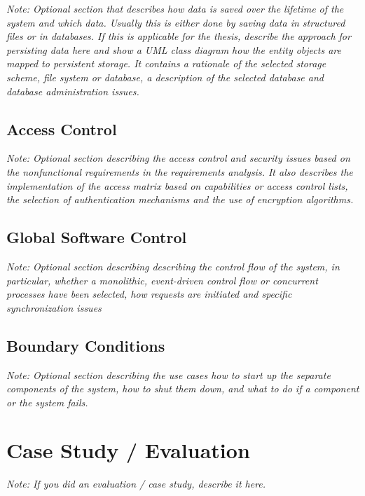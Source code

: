 \documentclass[a4paper,12pt,twoside]{report}
\begin{document}
\textit{Note: Optional section that describes how data is saved over the lifetime of the system and which data. Usually this is either done by saving data in structured files or in databases. If this is applicable for the thesis, describe the approach for persisting data here and show a UML class diagram how the entity objects are mapped to persistent storage.
It contains a rationale of the selected storage scheme, file system or database, a description of the selected database and database administration issues.}

\section{Access Control}

\textit{Note: Optional section describing the access control and security issues based on the nonfunctional requirements in the requirements analysis. It also describes the implementation of the access matrix based on capabilities or access control lists, the selection of  authentication mechanisms and the use of encryption algorithms.}

\section{Global Software Control}

\textit{Note: Optional section describing describing the control flow of the system, in particular, whether a monolithic, event-driven control flow or concurrent processes have been selected, how requests are initiated and specific synchronization issues}


\section{Boundary Conditions}

\textit{Note: Optional section describing the use cases how to start up the separate components of the system, how to shut them down, and what to do if a component or the system fails.}






\chapter{Case Study / Evaluation}

\textit{Note: If you did an evaluation / case study, describe it here.}
\end{document}
